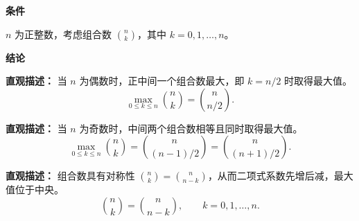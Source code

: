 \begin{statementbox}
	\textbf{\textcolor{CStatement}{条件}}
	\begin{description}[style=nextline, leftmargin=2.8em, labelsep=0.5em, itemsep=0.35em]
		\item[\textbf{\textcolor{CStatement}{条件 1（n为正整数）：}}] $n$ 为正整数，考虑组合数 $\binom{n}{k}$，其中 $k = 0,1,\dots,n$。
	\end{description}

	\textbf{\textcolor{CStatement}{结论}}
	\begin{description}[style=nextline, leftmargin=2.8em, labelsep=0.5em, itemsep=0.45em]
		\item[\textbf{\textcolor{CStatement}{结论一（偶数情形）：}}]
			\textbf{\textcolor{CStatement}{直观描述：}}
			当 $n$ 为偶数时，正中间一个组合数最大，即 $k = n/2$ 时取得最大值。
			\[
				\max_{0\le k\le n} \binom{n}{k} = \binom{n}{n/2}.
			\]

		\item[\textbf{\textcolor{CStatement}{结论二（奇数情形）：}}]
			\textbf{\textcolor{CStatement}{直观描述：}}
			当 $n$ 为奇数时，中间两个组合数相等且同时取得最大值。
			\[
				\max_{0\le k\le n} \binom{n}{k} = \binom{n}{(n-1)/2} = \binom{n}{(n+1)/2}.
			\]

		\item[\textbf{\textcolor{CStatement}{推广结论（对称性质）：}}]
			\textbf{\textcolor{CStatement}{直观描述：}}
			组合数具有对称性 $\binom{n}{k} = \binom{n}{n-k}$，从而二项式系数先增后减，最大值位于中央。
			\[
				\binom{n}{k} = \binom{n}{n-k},
				\qquad
				k=0,1,\dots,n.
			\]
	\end{description}
\end{statementbox}
